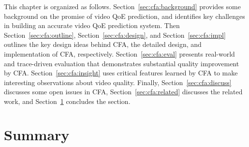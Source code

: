 This chapter is organized as follows.
Section~\ref{sec:cfa:background} provides some background on
the promise of video QoE prediction, and identifies key challenges
 in building an accurate video QoE prediction
system.
Then Section~\ref{sec:cfa:outline}, Section~\ref{sec:cfa:design},
and Section~\ref{sec:cfa:impl} outlines the key design ideas 
behind CFA, the detailed design, and implementation of CFA, respectively.
Section~\ref{sec:cfa:eval} presents real-world and trace-driven evaluation that 
demonstrates substantial quality improvement by CFA.
Section~\ref{sec:cfa:insight} uses critical features learned by 
CFA to make interesting
observations about video quality.
Finally, Section~\ref{sec:cfa:discuss} discusses some open issues in 
CFA, Section~\ref{sec:cfa:related} discusses the related work, and 
Section~\ref{sec:cfa:summary} concludes the section.
















\section{Summary}
\label{sec:cfa:summary}


